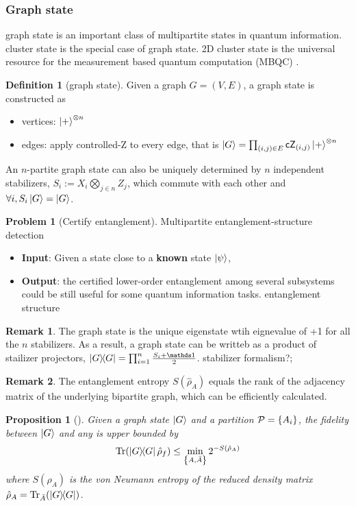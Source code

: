 \documentclass[
aps,
pra,
linenumbers,
floatfix,
]{revtex4-2}
\theoremstyle{plain}
\newtheorem{proposition}{Proposition}
\theoremstyle{definition}
\newtheorem{definition}{Definition}
\newtheorem{remark}{Remark}
\newtheorem{problem}{Problem}
\newcommand{\dm}{\hat{\rho}}
\begin{document}
\subsubsection{Graph state}
graph state is an important class of multipartite states in quantum information.
cluster state is the special case of graph state.
2D cluster state is the universal resource for the measurement based quantum computation (MBQC) \cite{briegelMeasurementbasedQuantumComputation2009}.
\begin{definition}[graph state]
	Given a graph $G=(V,E)$, a graph state is constructed as 
	\begin{itemize}
		\item vertices: $\ket{+}^{\otimes n}$
		\item edges: apply controlled-Z to every edge,
		that is $\ket{G}=\prod_{(i,j)\in E}\textsf{cZ}_{(i,j)} \ket{+}^{\otimes n}$
	\end{itemize}
	An $n$-partite graph state can also be uniquely determined by $n$ independent stabilizers, 
	$S_i:= X_i \bigotimes_{j\in n}Z_j$, 
	which commute with each other and $\forall i,S_i\ket{G}=\ket{G}$.
\end{definition}
\begin{problem}[Certify entanglement]
	Multipartite entanglement-structure detection
	\begin{itemize}
		\item \textbf{Input}: Given a state close to a \textbf{known} state $\ket{\psi}$,
		\item \textbf{Output}: the certified lower-order entanglement among several subsystems could be still useful for some quantum information tasks.
		entanglement structure
	\end{itemize}
\end{problem}
\begin{remark}
	The graph state is the unique eigenstate wtih eignevalue of +1 for all the $n$ stabilizers.
	As a result, a graph state can be writteb as a product of stailizer projectors, $\op{G}=\prod_{i=1}^n \frac{S_i +\identity}{2}$.
	stabilizer formalism?; 
\end{remark}
\begin{remark}
	The entanglement entropy $S( \dm_A )$ equals the rank of the adjacency matrix of the underlying bipartite graph, which can be efficiently calculated.
\end{remark}
\begin{proposition}[\cite{zhouDetectingMultipartiteEntanglement2019}]
	Given a graph state $\ket{G}$ and a partition $\mathcal{P}=\qty{A_i}$, the fidelity between $\ket{G}$ and any  is upper bounded by
	\begin{equation}
		\Tr(\op{G} \dm_f) \le \min_{\qty{A,\bar{A}}} 2^{-S(\dm_A)}
	\end{equation}
	where $S(\dm_A)$ is the von Neumann entropy of the reduced density matrix $\dm_A=\Tr_{\bar{A}}(\op{G})$.
\end{proposition}
\end{document}
